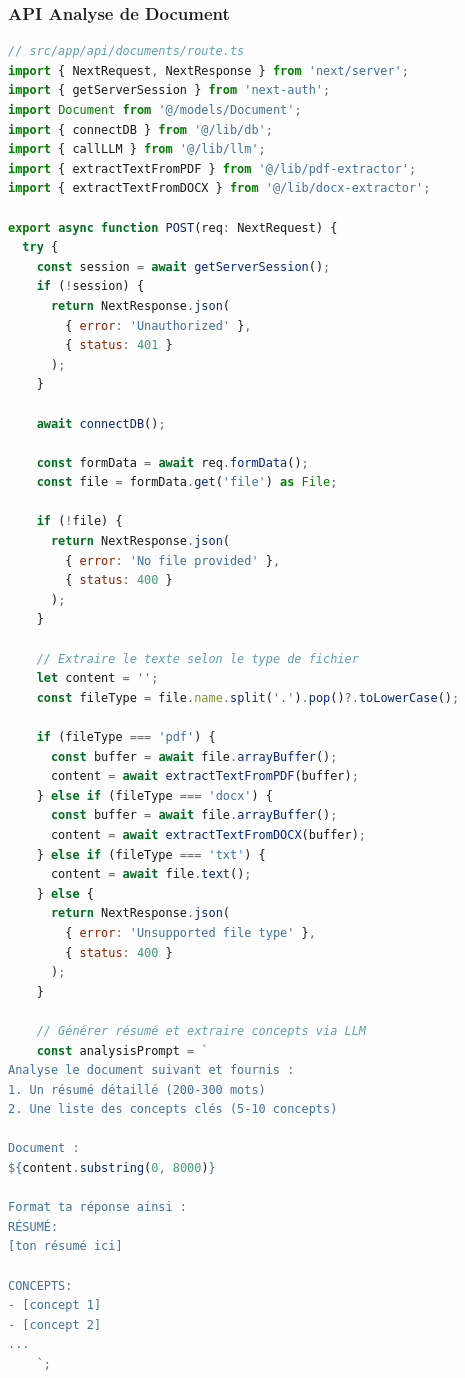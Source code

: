 \subsubsection{API Analyse de Document}

\begin{lstlisting}[language=JavaScript, caption=API Route pour l'analyse de documents, label=code:api-documents]
// src/app/api/documents/route.ts
import { NextRequest, NextResponse } from 'next/server';
import { getServerSession } from 'next-auth';
import Document from '@/models/Document';
import { connectDB } from '@/lib/db';
import { callLLM } from '@/lib/llm';
import { extractTextFromPDF } from '@/lib/pdf-extractor';
import { extractTextFromDOCX } from '@/lib/docx-extractor';

export async function POST(req: NextRequest) {
  try {
    const session = await getServerSession();
    if (!session) {
      return NextResponse.json(
        { error: 'Unauthorized' },
        { status: 401 }
      );
    }

    await connectDB();

    const formData = await req.formData();
    const file = formData.get('file') as File;

    if (!file) {
      return NextResponse.json(
        { error: 'No file provided' },
        { status: 400 }
      );
    }

    // Extraire le texte selon le type de fichier
    let content = '';
    const fileType = file.name.split('.').pop()?.toLowerCase();

    if (fileType === 'pdf') {
      const buffer = await file.arrayBuffer();
      content = await extractTextFromPDF(buffer);
    } else if (fileType === 'docx') {
      const buffer = await file.arrayBuffer();
      content = await extractTextFromDOCX(buffer);
    } else if (fileType === 'txt') {
      content = await file.text();
    } else {
      return NextResponse.json(
        { error: 'Unsupported file type' },
        { status: 400 }
      );
    }

    // Générer résumé et extraire concepts via LLM
    const analysisPrompt = `
Analyse le document suivant et fournis :
1. Un résumé détaillé (200-300 mots)
2. Une liste des concepts clés (5-10 concepts)

Document :
${content.substring(0, 8000)}

Format ta réponse ainsi :
RÉSUMÉ:
[ton résumé ici]

CONCEPTS:
- [concept 1]
- [concept 2]
...
    `;


\end{lstlisting}
